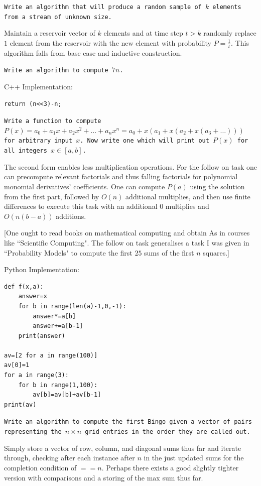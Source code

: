 \texttt{Write an algorithm that will produce a random sample of $k$ elements from a stream of unknown size.}

Maintain a reservoir vector of $k$ elements and at time step $t>k$ randomly replace $1$ element from the reservoir with the new element with probability $P=\frac{1}{t}$. This algorithm falls from base case and inductive construction.

\texttt{Write an algorithm to compute $7n$.}

C++ Implementation:

\begin{verbatim}
return (n<<3)-n;
\end{verbatim}

\texttt{Write a function to compute $P(x)=a_0+a_1 x+a_2 x^2 + \dots + a_n x^n=a_0+x(a_1+x(a_2+x(a_3+\dots)))$ for arbitrary input $x$. Now write one which will print out $P(x)$ for all integers $x \in [a,b]$.}

The second form enables less multiplication operations. For the follow on task one can precompute relevant factorials and thus falling factorials for polynomial monomial derivatives' coefficients. One can compute $P(a)$ using the solution from the first part, followed by $O(n)$ additional multiplies, and then use finite differences to execute this task with an additional $0$ multiplies and $O(n(b-a))$ additions.

[One ought to read books on mathematical computing and obtain As in courses like ``Scientific Computing". The follow on task generalises a task I was given in ``Probability Models" to compute the first $25$ sums of the first $n$ squares.]

Python Implementation:

\begin{verbatim}
def f(x,a):
    answer=x
    for b in range(len(a)-1,0,-1):
        answer*=a[b]
        answer+=a[b-1]
    print(answer)

av=[2 for a in range(100)]
av[0]=1
for a in range(3):
    for b in range(1,100):
        av[b]=av[b]+av[b-1]
print(av)
\end{verbatim}

\texttt{Write an algorithm to compute the first Bingo given a vector of pairs representing the $n \times n$ grid entries in the order they are called out.}

Simply store a vector of row, column, and diagonal sums thus far and iterate through, checking after each instance after $n$ in the just updated sums for the completion condition of $==n$. Perhaps there exists a good slightly tighter version with comparisons and a storing of the max sum thus far.

